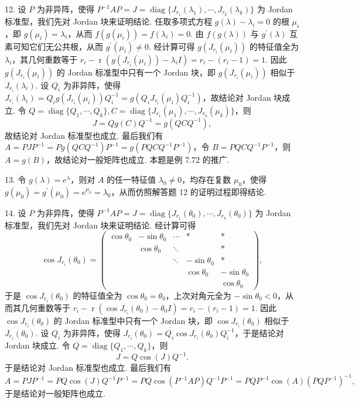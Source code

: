 \documentclass[UTF8,12pt,a4paper,fontset=fandol]{ctexart}
\begin{document}
12. 设 $P$ 为非异阵，使得 $P^{-1}AP=J=\operatorname{diag}\{J_{r_1}(\lambda_1),\cdots,J_{r_k}(\lambda_k)\}$ 为 Jordan 标准型，我们先对 Jordan 块来证明结论. 任取多项式方程 $g(\lambda)-\lambda_i=0$ 的根 $\mu_i$，即 $g(\mu_i)=\lambda_i$，从而 $f(g(\mu_i))=f(\lambda_i)=0$. 由 $f(g(\lambda))$ 与 $g^{\prime}(\lambda)$ 互素可知它们无公共根，从而 $g^{\prime}(\mu_i)\ne0$. 经计算可得 $g(J_{r_i}(\mu_i))$ 的特征值全为 $\lambda_i$，其几何重数等于 $r_i-\operatorname{r}(g(J_{r_i}(\mu_i))-\lambda_iI)=r_i-(r_i-1)=1$. 因此 $g(J_{r_i}(\mu_i))$ 的 Jordan 标准型中只有一个 Jordan 块，即 $g(J_{r_i}(\mu_i))$ 相似于 $J_{r_i}(\lambda_i)$. 设 $Q_i$ 为非异阵，使得 $J_{r_i}(\lambda_i)=Q_ig(J_{r_i}(\mu_i))Q_i^{-1}=g(Q_iJ_{r_i}(\mu_i)Q_i^{-1})$，故结论对 Jordan 块成立. 令 $Q=\operatorname{diag}\{Q_1,\cdots,Q_k\},C=\operatorname{diag}\{J_{r_1}(\mu_1),\cdots,J_{r_k}(\mu_k)\}$，则
\[
J=Qg(C)Q^{-1}=g(QCQ^{-1}),
\]
故结论对 Jordan 标准型也成立. 最后我们有 $A=PJP^{-1}=Pg(QCQ^{-1})P^{-1}=g(PQCQ^{-1}P^{-1})$，令 $B=PQCQ^{-1}P^{-1}$，则 $A=g(B)$，故结论对一般矩阵也成立. 本题是例 7.72 的推广.

13. 令 $g(\lambda)=e^{\lambda}$，则对 $A$ 的任一特征值 $\lambda_0\ne0$，均存在复数 $\mu_0$，使得 $g(\mu_0)=g^{\prime}(\mu_0)=e^{\mu_0}=\lambda_0$，从而仿照解答题 12 的证明过程即得结论.

14. 设 $P$ 为非异阵，使得 $P^{-1}AP=J=\operatorname{diag}\{J_{r_1}(\theta_0),\cdots,J_{r_k}(\theta_0)\}$ 为 Jordan 标准型，我们先对 Jordan 块来证明结论. 经计算可得
\[
\cos J_{r_i}(\theta_0)=\left(\begin{array}{ccccc}
\cos\theta_0&-\sin\theta_0&\cdots&*&*\\
&\cos\theta_0&\ddots&&*\\
&&\ddots&-\sin\theta_0&*\\
&&&\cos\theta_0&-\sin\theta_0\\
&&&&\cos\theta_0
\end{array}\right),
\]
于是 $\cos J_{r_i}(\theta_0)$ 的特征值全为 $\cos\theta_0=\theta_0$，上次对角元全为 $-\sin\theta_0<0$，从而其几何重数等于 $r_i-\operatorname{r}(\cos J_{r_i}(\theta_0)-\theta_0I)=r_i-(r_i-1)=1$. 因此 $\cos J_{r_i}(\theta_0)$ 的 Jordan 标准型中只有一个 Jordan 块，即 $\cos J_{r_i}(\theta_0)$ 相似于 $J_{r_i}(\theta_0)$. 设 $Q_i$ 为非异阵，使得 $J_{r_i}(\theta_0)=Q_i\cos J_{r_i}(\theta_0)Q_i^{-1}$，于是结论对 Jordan 块成立. 令 $Q=\operatorname{diag}\{Q_1,\cdots,Q_k\}$，则
\[
J=Q\cos(J)Q^{-1}.
\]
于是结论对 Jordan 标准型也成立. 最后我们有
\[
A=PJP^{-1}=PQ\cos(J)Q^{-1}P^{-1}=PQ\cos(P^{-1}AP)Q^{-1}P^{-1}=PQP^{-1}\cos(A)(PQP^{-1})^{-1},
\]
于是结论对一般矩阵也成立.
\end{document}
